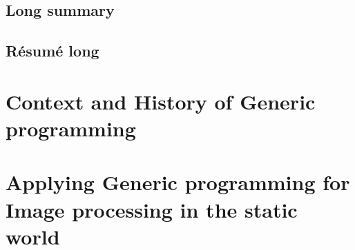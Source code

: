 \documentclass[11pt,a4paper]{book}
\begin{document}
\flyleaf

\cleardoublepage




\cleardoublepage



\cleardoublepage

\setcounter{figure}{0}
\setcounter{table}{0}

\chapter*{Long summary}
\label{chap:long_summary}


\cleardoublepage

\setcounter{figure}{0}
\setcounter{table}{0}

\chapter*{R\'{e}sum\'{e} long}
\label{chap:resume_long}


\cleardoublepage

\setcounter{figure}{0}
\setcounter{table}{0}

\tableofcontents
\label{table.of.contents}

\listoffigures
\label{list.of.figures}

\listoftables
\label{list.of.tables}

\cleardoublepage


\part{Context and History of Generic programming}
\label{part:context.history}




\cleardoublepage



\cleardoublepage


\part{Applying Generic programming for Image processing in the static world}
\label{part:static.world}




\cleardoublepage
\end{document}
